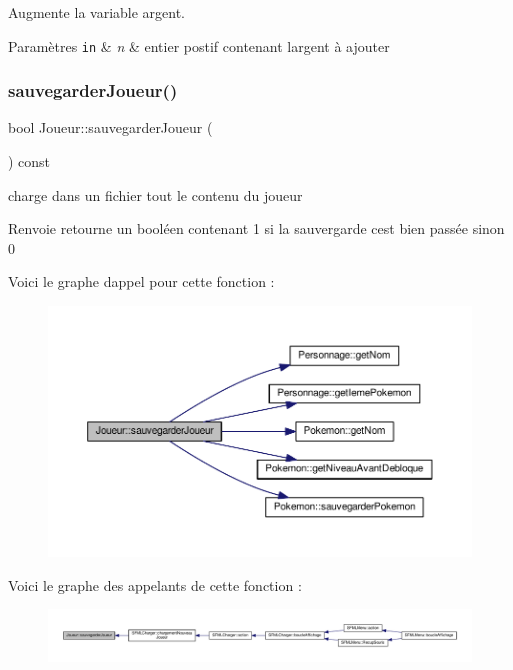 Augmente la variable argent. 


\begin{DoxyParams}[1]{Paramètres}
\mbox{\tt in}  & {\em n} & entier postif contenant l\textquotesingle{}argent à ajouter \\
\hline
\end{DoxyParams}
\mbox{\label{class_joueur_a0bf50be14471ba0c0944b31c70bf6ad3}} 
\subsubsection{\texorpdfstring{sauvegarder\+Joueur()}{sauvegarderJoueur()}}
{\footnotesize\ttfamily bool Joueur\+::sauvegarder\+Joueur (\begin{DoxyParamCaption}{ }\end{DoxyParamCaption}) const}



charge dans un fichier tout le contenu du joueur 

\begin{DoxyReturn}{Renvoie}
retourne un booléen contenant 1 si la sauvergarde c\textquotesingle{}est bien passée sinon 0 
\end{DoxyReturn}
Voici le graphe d\textquotesingle{}appel pour cette fonction \+:\nopagebreak
\begin{figure}[H]
\begin{center}
\leavevmode
\includegraphics[width=350pt]{class_joueur_a0bf50be14471ba0c0944b31c70bf6ad3_cgraph}
\end{center}
\end{figure}
Voici le graphe des appelants de cette fonction \+:\nopagebreak
\begin{figure}[H]
\begin{center}
\leavevmode
\includegraphics[width=350pt]{class_joueur_a0bf50be14471ba0c0944b31c70bf6ad3_icgraph}
\end{center}
\end{figure}


